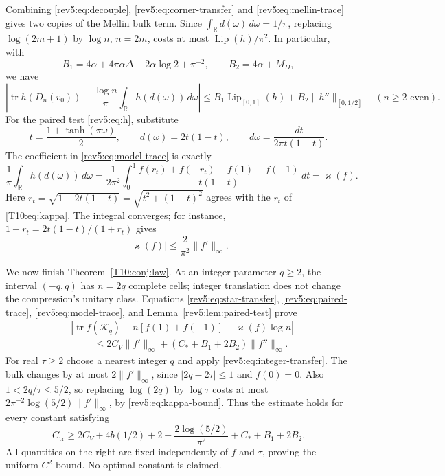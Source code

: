 Combining \eqref{rev5:eq:decouple}, \eqref{rev5:eq:corner-transfer}
and \eqref{rev5:eq:mellin-trace} gives two copies of the Mellin bulk
term.  Since $\int_{\mathbb R}d(\omega)\,d\omega=1/\pi$, replacing
$\log(2m+1)$ by $\log n$, $n=2m$, costs at most
$\operatorname{Lip}(h)/\pi^2$.  In particular, with
\begin{equation}\label{rev5:eq:model-constants}
 B_1=4\alpha+4\pi\alpha\Delta+2\alpha\log2+\pi^{-2},
 \qquad B_2=4\alpha+M_D,
\end{equation}
we have
\begin{equation}\label{rev5:eq:model-trace}
 \left|\operatorname{tr}h(D_n(v_0))
    -\frac{\log n}{\pi}\int_{\mathbb R}h(d(\omega))\,d\omega\right|
 \leq B_1\operatorname{Lip}_{[0,1]}(h)
       +B_2\|h''\|_{[0,1/2]}
 \quad(n\geq2\text{ even}).
\end{equation}
For the paired test \eqref{rev5:eq:h}, substitute
\[
 t=\frac{1+\tanh(\pi\omega)}2,
 \qquad d(\omega)=2t(1-t),\qquad
 d\omega=\frac{dt}{2\pi t(1-t)}.
\]
The coefficient in \eqref{rev5:eq:model-trace} is exactly
\begin{equation}\label{rev5:eq:coefficient}
 \frac1\pi\int_{\mathbb R}h(d(\omega))\,d\omega
 =\frac1{2\pi^2}\int_0^1
 \frac{f(r_t)+f(-r_t)-f(1)-f(-1)}{t(1-t)}\,dt
 =\varkappa(f).
\end{equation}
Here $r_t=\sqrt{1-2t(1-t)}=\sqrt{t^2+(1-t)^2}$ agrees with the $r_t$ of
\eqref{T10:eq:kappa}.  The integral converges; for instance,
$1-r_t=2t(1-t)/(1+r_t)$ gives
\begin{equation}\label{rev5:eq:kappa-bound}
 |\varkappa(f)|\leq\frac{2}{\pi^2}\|f'\|_\infty.
\end{equation}

We now finish Theorem~\ref{T10:conj:law}.  At an integer parameter
$q\geq2$, the interval $(-q,q)$ has $n=2q$ complete cells; integer
translation does not change the compression's unitary class.  Equations
\eqref{rev5:eq:star-transfer}, \eqref{rev5:eq:paired-trace},
\eqref{rev5:eq:model-trace}, and Lemma~\ref{rev5:lem:paired-test} prove
\begin{equation}\label{rev5:eq:whole-cell-law}
 \begin{split}
 &\left|\operatorname{tr}f(\mathcal K_q)
       -n[f(1)+f(-1)]-\varkappa(f)\log n\right|\\
 &\hspace{1cm}\leq2C_V\|f'\|_\infty
             +(C_*+B_1+2B_2)\|f''\|_\infty.
 \end{split}
\end{equation}
For real $\tau\geq2$ choose a nearest integer $q$ and apply
\eqref{rev5:eq:integer-transfer}.  The bulk changes by at most
$2\|f'\|_\infty$, since $|2q-2\tau|\leq1$ and $f(0)=0$.
Also $1<2q/\tau\leq5/2$, so replacing $\log(2q)$ by $\log\tau$
costs at most $2\pi^{-2}\log(5/2)\|f'\|_\infty$, by
\eqref{rev5:eq:kappa-bound}.  Thus the estimate holds for every constant satisfying
\begin{equation}\label{rev5:eq:final-constant}
 C_{\mathrm{tr}}\ge2C_V+4b(1/2)+2+\frac{2\log(5/2)}{\pi^2}
       +C_*+B_1+2B_2.
\end{equation}
All quantities on the right are fixed independently of $f$ and
$\tau$, proving the uniform $C^2$ bound. No optimal constant is claimed.

